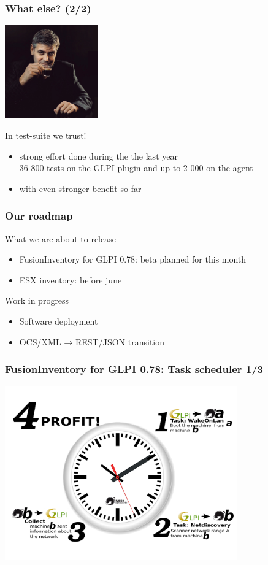 \documentclass{beamer}
\begin{document}
\begin{frame}
    \frametitle{What else? (2/2)}

    \begin{center}
    \includegraphics[height=4.0cm]{pics/whatelse.jpg}
    \end{center}

    \begin{block}{In test-suite we trust!}
        \begin{itemize}
            \item strong effort done during the the last year \\
            \small{36 800 tests on the GLPI plugin and up to 2 000 on the agent}
            \item with even stronger benefit so far
        \end{itemize}
    \end{block}
\end{frame}

\begin{frame}
    \frametitle{Our roadmap}

    What we are about to release
    \begin{itemize}
    \item FusionInventory for GLPI 0.78: beta planned for this month
    \item ESX inventory: before june
    \end{itemize}

    Work in progress
    \begin{itemize}
    \item Software deployment
    \item OCS/XML → REST/JSON transition
    \end{itemize}
\end{frame}

\begin{frame}
\frametitle{FusionInventory for GLPI 0.78: Task scheduler 1/3}
    \includegraphics[height=7.5cm]{pics/fusion_task.pdf}
\end{frame}
\end{document}
